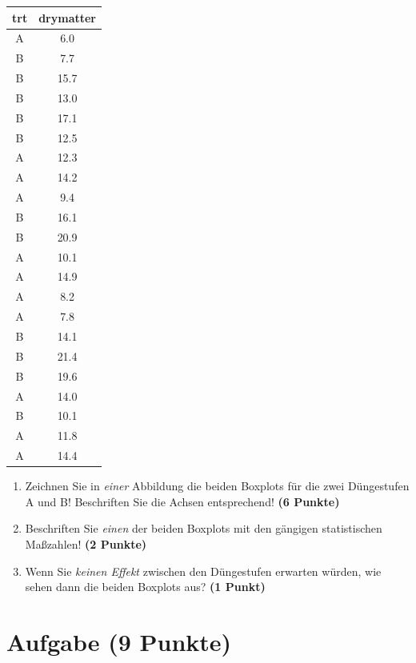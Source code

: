 \documentclass[a4paper, 10pt]{scrartcl}\usepackage[]{graphicx}\usepackage[]{xcolor}
\begin{document}
\begin{table}[!h]
\centering
\begin{tabular}{cc}
\toprule
trt & drymatter\\
\midrule
A & 6.0\\
B & 7.7\\
B & 15.7\\
B & 13.0\\
B & 17.1\\
\addlinespace
B & 12.5\\
A & 12.3\\
A & 14.2\\
A & 9.4\\
B & 16.1\\
\addlinespace
B & 20.9\\
A & 10.1\\
A & 14.9\\
A & 8.2\\
A & 7.8\\
\addlinespace
B & 14.1\\
B & 21.4\\
B & 19.6\\
A & 14.0\\
B & 10.1\\
\addlinespace
A & 11.8\\
A & 14.4\\
\bottomrule
\end{tabular}
\end{table}



\begin{enumerate}
\item Zeichnen Sie in \textit{einer} Abbildung die beiden Boxplots f{\"u}r die
  zwei D{\"u}ngestufen A und B! Beschriften Sie die Achsen entsprechend!
  \textbf{(6 Punkte)}
\item Beschriften Sie \textit{einen} der beiden Boxplots mit den g{\"a}ngigen
  statistischen Ma{\ss}zahlen! \textbf{(2 Punkte)}
\item Wenn Sie \textit{keinen Effekt} zwischen den D{\"u}ngestufen erwarten
  w{\"u}rden, wie sehen dann die beiden Boxplots aus? \textbf{(1 Punkt)}
\end{enumerate} 
\clearpage

\section{Aufgabe \hfill (9 Punkte)}
\end{document}
